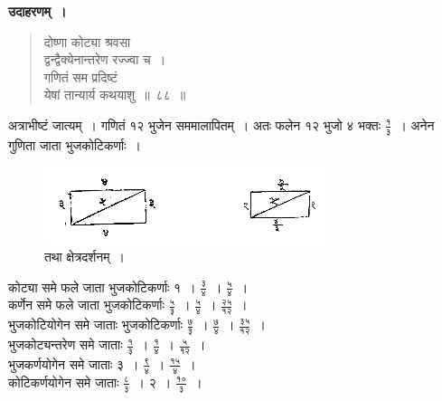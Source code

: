 \documentclass[11pt, openany]{book}
\begin{document}
 \textbf{उदाहरणम्~।} 
\begin{quote}
    \bqt 
     दोष्णा कोट्या श्रवसा \\
द्वन्द्वैक्येनान्तरेण रज्ज्वा च~। \\
गणितं सम प्रदिष्टं \\
येषां तान्यार्य कथयाशु~॥~८८~॥~
\end{quote}

 अत्राभीष्टं जात्यम्~। गणितं १२ भुजेन सममालापितम्~। अतः फलेन १२ भुजो ४
भक्तः $\frac{\mbox{१}}{\mbox{३}}$~। अनेन गुणिता जाता भुजकोटिकर्णाः~। 
\newpage%

\begin{figure}[h!]
     \centering
      \captionsetup{labelformat=empty}
          \caption{तथा क्षेत्रदर्शनम्~। }
\vspace{-2mm}
     \includegraphics[scale=0.85]{graphics/capture142.png}
\end{figure} 

कोट्या समे फले जाता भुजकोटिकर्णाः १~। $\frac{\mbox{३}}{\mbox{४}}$~। $\frac{\mbox{५}}{\mbox{४}}$~। \\

\vspace{-2mm}
कर्णेन समे फले जाता भुजकोटिकर्णाः $\frac{\mbox{५}}{\mbox{३}}$~। $\frac{\mbox{५}}{\mbox{४}}$~। $\frac{\mbox{२५}}{\mbox{१२}}$~।\\

\vspace{-2mm}
भुजकोटियोगेन समे जाताः भुजकोटिकर्णाः $\frac{\mbox{७}}{\mbox{३}}$~। $\frac{\mbox{७}}{\mbox{४}}$~। $\frac{\mbox{३५}}{\mbox{१२}}$~।\\

\vspace{-2mm}
भुजकोट्यन्तरेण समे जाताः $\frac{\mbox{१}}{\mbox{३}}$~। $\frac{\mbox{१}}{\mbox{४}}$~। $\frac{\mbox{५}}{\mbox{१२}}$~। \\

\vspace{-2mm}
भुजकर्णयोगेन समे जाताः ३~। $\frac{\mbox{९}}{\mbox{४}}$~। $\frac{\mbox{१५}}{\mbox{४}}$~। \\

\vspace{-2mm}
कोटिकर्णयोगेन समे जाताः $\frac{\mbox{८}}{\mbox{३}}$~। २~। $\frac{\mbox{१०}}{\mbox{३}}$~। \\
\end{document}
